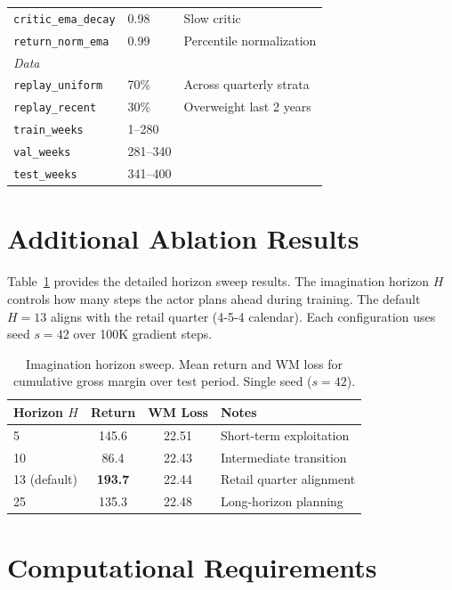 \begin{table}[h]
\begin{tabular}{@{}lll@{}}
\texttt{critic\_ema\_decay} & 0.98 & Slow critic \\
\texttt{return\_norm\_ema} & 0.99 & Percentile normalization \\
\midrule
\multicolumn{3}{l}{\textit{Data}} \\
\texttt{replay\_uniform} & 70\% & Across quarterly strata \\
\texttt{replay\_recent} & 30\% & Overweight last 2 years \\
\texttt{train\_weeks} & 1--280 & \\
\texttt{val\_weeks} & 281--340 & \\
\texttt{test\_weeks} & 341--400 & \\
\bottomrule
\end{tabular}
\end{table}

\section{Additional Ablation Results}
\label{app:ablation-horizon}

Table~\ref{tab:horizon-sweep} provides the detailed horizon sweep results. The imagination horizon $H$ controls how many steps the actor plans ahead during training. The default $H = 13$ aligns with the retail quarter (4-5-4 calendar). Each configuration uses seed $s = 42$ over 100K gradient steps.

\begin{table}[h]
\centering
\caption{Imagination horizon sweep. Mean return and WM loss for cumulative gross margin over test period. Single seed ($s = 42$).}
\label{tab:horizon-sweep}
\begin{tabular}{@{}lccl@{}}
\toprule
\textbf{Horizon $H$} & \textbf{Return} & \textbf{WM Loss} & \textbf{Notes} \\
\midrule
5 & 145.6 & 22.51 & Short-term exploitation \\
10 & 86.4 & 22.43 & Intermediate transition \\
13 (default) & \textbf{193.7} & 22.44 & Retail quarter alignment \\
25 & 135.3 & 22.48 & Long-horizon planning \\
\bottomrule
\end{tabular}
\end{table}

\section{Computational Requirements}
\label{app:compute}

